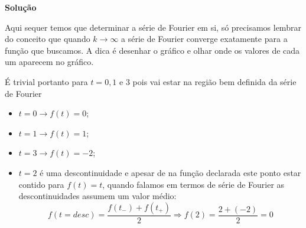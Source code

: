 \linespread{1.5}

\textbf{Solução}

Aqui sequer temos que determinar a série de Fourier em si, só precisamos lembrar do conceito que quando $k\rightarrow{}\infty$ a série de Fourier converge exatamente para a função que buscamos. A dica é desenhar o gráfico e olhar onde os valores de cada um aparecem no gráfico.

É trivial portanto para $t=0,1$ e $3$ pois vai estar na região bem definida da série de Fourier
\begin{itemize}
    \item $t=0 \rightarrow f(t) = 0$;
    \item $t=1 \rightarrow f(t) = 1$;
    \item $t=3 \rightarrow f(t) = -2$;
    \item $t=2$ é uma descontinuidade e apesar de na função declarada este ponto estar contido para $f(t) = t$, quando falamos em termos de série de Fourier as descontinuidades assumem um valor médio:
    \begin{equation*}
        f(t=desc) = \frac{f(t_-) + f(t_+)}{2} \Rightarrow f(2) = \frac{2 + (-2)}{2} = 0
    \end{equation*}
\end{itemize}